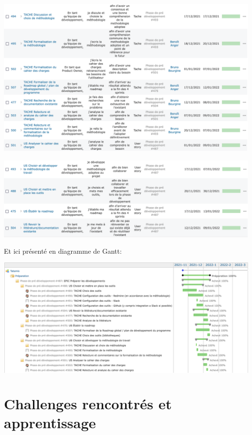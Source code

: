 \begin{center}
    \includegraphics[width=17cm]{images/roadmap-predev-part2.png}

    \includegraphics[width=17cm]{images/roadmap-predev-part3.png}
\end{center}

\newpage
Et ici présenté en diagramme de Gantt:

\begin{center}
  \includegraphics[width=16cm]{images/tatamis-gantt-predev.png}
\end{center}

\section{Challenges rencontrés et apprentissage}

